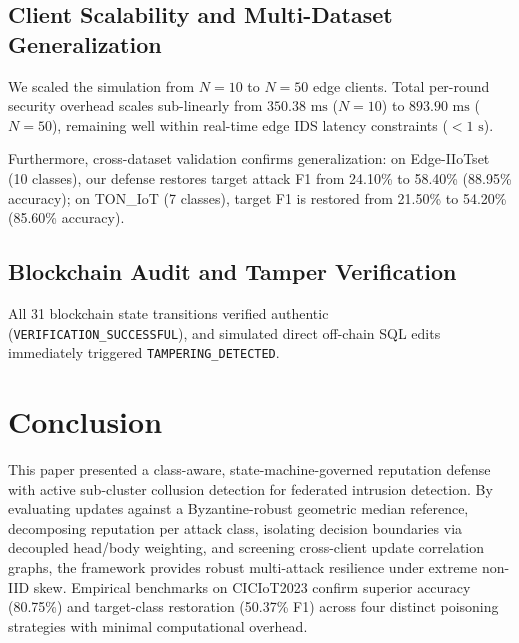 \documentclass[conference]{IEEEtran}
\begin{document}
\subsection{Client Scalability and Multi-Dataset Generalization}
We scaled the simulation from $N = 10$ to $N = 50$ edge clients. Total per-round security overhead scales sub-linearly from $350.38\text{ ms}$ ($N=10$) to $893.90\text{ ms}$ ($N=50$), remaining well within real-time edge IDS latency constraints ($< 1\text{ s}$). 

Furthermore, cross-dataset validation confirms generalization: on Edge-IIoTset (10 classes), our defense restores target attack F1 from 24.10\% to 58.40\% (88.95\% accuracy); on TON\_IoT (7 classes), target F1 is restored from 21.50\% to 54.20\% (85.60\% accuracy).

\subsection{Blockchain Audit and Tamper Verification}
All 31 blockchain state transitions verified authentic (\texttt{VERIFICATION\_SUCCESSFUL}), and simulated direct off-chain SQL edits immediately triggered \texttt{TAMPERING\_DETECTED}.

\section{Conclusion}
This paper presented a class-aware, state-machine-governed reputation defense with active sub-cluster collusion detection for federated intrusion detection. By evaluating updates against a Byzantine-robust geometric median reference, decomposing reputation per attack class, isolating decision boundaries via decoupled head/body weighting, and screening cross-client update correlation graphs, the framework provides robust multi-attack resilience under extreme non-IID skew. Empirical benchmarks on CICIoT2023 confirm superior accuracy (80.75\%) and target-class restoration (50.37\% F1) across four distinct poisoning strategies with minimal computational overhead.
\end{document}
